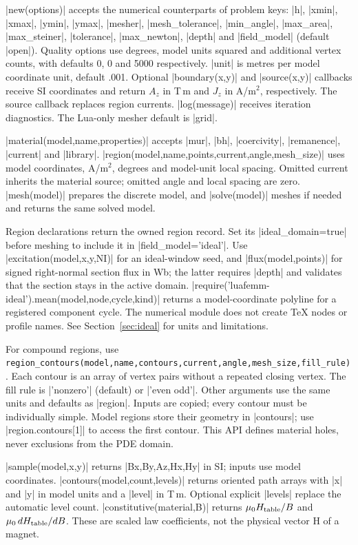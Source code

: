 |new(options)| accepts the numerical counterparts of problem keys:
|h|, |xmin|, |xmax|, |ymin|, |ymax|, |mesher|, |mesh_tolerance|,
|min_angle|, |max_area|, |max_steiner|, |tolerance|, |max_newton|,
|depth| and |field_model| (default |open|).
Quality options use degrees, model units squared and additional vertex counts,
with defaults 0, 0 and 5000 respectively. |unit| is metres per model coordinate unit,
default .001. Optional |boundary(x,y)| and |source(x,y)| callbacks receive
SI coordinates and return $A_z$ in T\,m and $J_z$ in A/m$^2$, respectively.
The source callback replaces region currents. |log(message)| receives
iteration diagnostics. The Lua-only mesher default is |grid|.

|material(model,name,properties)| accepts |mur|, |bh|, |coercivity|,
|remanence|, |current| and |library|. |region(model,name,points,current,angle,mesh_size)|
uses model coordinates, A/m$^2$, degrees and model-unit local spacing.
Omitted current inherits the material source; omitted angle and local
spacing are zero. |mesh(model)| prepares the discrete model, and
|solve(model)| meshes if needed and returns the same solved model.

Region declarations return the owned region record. Set its |ideal_domain=true|
before meshing to include it in |field_model='ideal'|. Use
|excitation(model,x,y,NI)| for an ideal-window seed, and
|flux(model,points)| for signed right-normal section flux in Wb; the latter
requires |depth| and validates that the section stays in the active domain.
|require('luafemm-ideal').mean(model,node,cycle,kind)| returns a model-coordinate
polyline for a registered component cycle. The numerical module does not create
TeX nodes or profile names. See Section~\ref{sec:ideal} for units and limitations.

For compound regions, use
\nolinkurl{region_contours(model,name,contours,current,angle,mesh_size,fill_rule)}.
Each contour is an array of vertex pairs without a repeated closing vertex.
The fill rule is |'nonzero'| (default) or |'even odd'|. Other arguments use
the same units and defaults as |region|. Inputs are copied; every contour
must be individually simple. Model regions store their geometry in |contours|;
use |region.contours[1]| to access the first contour.
This API defines material holes, never exclusions from the PDE domain.

|sample(model,x,y)| returns |Bx,By,Az,Hx,Hy| in SI; inputs use model
coordinates. |contours(model,count,levels)| returns oriented path arrays
with |x| and |y| in model units and a |level| in T\,m. Optional explicit
|levels| replace the automatic level count. |constitutive(material,B)|
returns $\mu_0H_{\rm table}/B$ and $\mu_0\,dH_{\rm table}/dB$.
These are scaled law coefficients, not the physical vector H of a magnet.

